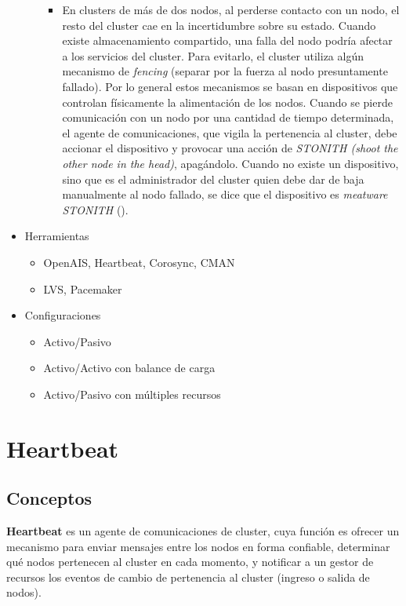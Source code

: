 \begin{itemize}
\begin{itemize}
\begin{itemize}
			\item En clusters de más de dos nodos, al perderse contacto con un nodo, el resto del cluster cae en la incertidumbre sobre su estado. Cuando existe almacenamiento compartido, una falla del nodo podría afectar a los servicios del cluster. Para evitarlo, el cluster utiliza algún mecanismo de \textit{fencing} (separar por la fuerza al nodo presuntamente fallado). Por lo general estos mecanismos se basan en dispositivos que controlan físicamente la alimentación de los nodos. Cuando se pierde comunicación con un nodo por una cantidad de tiempo determinada, el agente de comunicaciones, que vigila la pertenencia al cluster, debe accionar el dispositivo y provocar una acción de \textit{STONITH (shoot the other node in the head)}, apagándolo. Cuando no existe un dispositivo, sino que es el administrador del cluster quien debe dar de baja manualmente al nodo fallado, se dice que el dispositivo es \textit{meatware STONITH} (\smiley{}).
		\end{itemize}
	\end{itemize}
	\item Herramientas
	\begin{itemize}
		\item OpenAIS, Heartbeat, Corosync, CMAN
		\item LVS, Pacemaker
	\end{itemize}
	\item Configuraciones
	\begin{itemize}
		\item Activo/Pasivo
		\item Activo/Activo con balance de carga
		\item Activo/Pasivo con múltiples recursos
	\end{itemize}
\end{itemize}

\section{Heartbeat}


\subsection{Conceptos}
\textbf{Heartbeat} es un agente de comunicaciones de cluster, cuya función es ofrecer un mecanismo para enviar mensajes entre los nodos en forma confiable, determinar qué nodos pertenecen al cluster en cada momento, y notificar a un gestor de recursos los eventos de cambio de pertenencia al cluster (ingreso o salida de nodos). 


